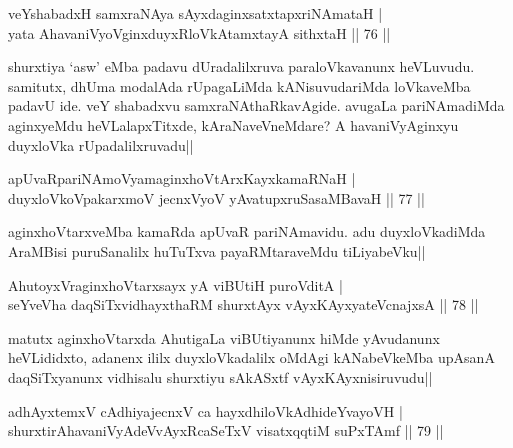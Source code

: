 \begin{shl}
veYshabadxH samxraNAya sAyxdaginxsatxtapxriNAmataH | \\
yata AhavaniVyoV\s ginxduyxRloVkAtamxtayA sithxtaH \hfill|| 76 || 
\end{shl}

\begin{artha}
shurxtiya `asw' eMba padavu dUradalilxruva paraloVkavanunx heVLuvudu. 
samitutx, dhUma modalAda rUpagaLiMda kANisuvudariMda loVkaveMba padavU 
ide. veY shabadxvu samxraNAthaRkavAgide. avugaLa pariNAmadiMda 
aginxyeMdu heVLalapxTitxde, kAraNaveVneMdare? A havaniVyAginxyu 
duyxloVka rUpadalilxruvadu||
\end{artha}


\begin{shl}
apUvaRpariNAmoV\s yamaginxhoVtArxKayxkamaRNaH | \\
duyxloVkoVpakarxmoV jecnxVyoV yAvatupxruSasaMBavaH \hfill|| 77 || 
\end{shl}

\begin{artha}
aginxhoVtarxveMba kamaRda apUvaR pariNAmavidu. adu duyxloVkadiMda 
AraMBisi puruSanalilx huTuTxva payaRMtaraveMdu tiLiyabeVku||
\end{artha}


\begin{shl}
AhutoyxVraginxhoVtarxsayx yA viBUtiH puroVditA | \\
seYveVha daqSiTxvidhayxthaRM shurxtAyx vAyxKAyxyateV\s cnajxsA \hfill|| 78 || 
\end{shl}

\begin{artha}
matutx aginxhoVtarxda AhutigaLa viBUtiyanunx hiMde yAvudanunx 
heVLididxto, adanenx ililx duyxloVkadalilx oMdAgi kANabeVkeMba upAsanA 
daqSiTxyanunx vidhisalu shurxtiyu sAkASxtf vAyxKAyxnisiruvudu||
\end{artha}

\begin{shl}
adhAyxtemxV cAdhiyajecnxV ca hayxdhiloVkAdhideYvayoVH | \\
shurxtirAhavaniVyAdeVvAyxRcaSeTxV visatxqqtiM suPxTAmf \hfill|| 79 || 
\end{shl}

